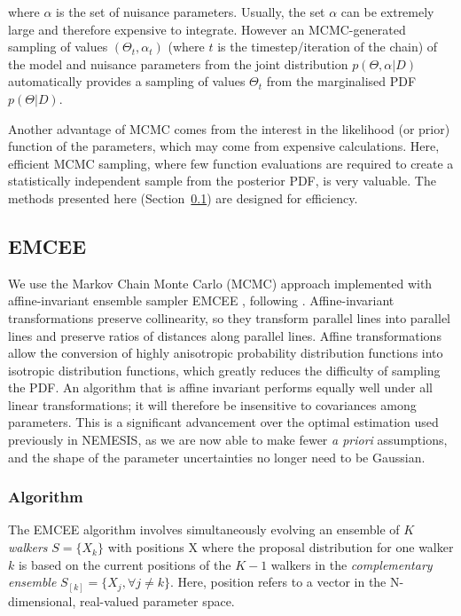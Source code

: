 \documentclass[11pt, a4paper,titlepage]{report}
\begin{document}
where $\alpha$ is the set of nuisance parameters. Usually, the set $\alpha$ can be extremely large and therefore expensive to integrate. However an MCMC-generated sampling of values  $(\Theta_t,\alpha_t)$ (where $t$ is the timestep/iteration of the chain) of the model and nuisance parameters from the joint distribution $p(\Theta, \alpha | D)$ automatically provides a sampling of values $\Theta_t$ from the marginalised PDF $p(\Theta | D)$.

Another advantage of MCMC comes from the interest in the likelihood (or prior) function of the parameters, which may come from expensive calculations. Here, efficient MCMC sampling, where few function evaluations are required to create a statistically independent sample from the posterior PDF, is very valuable.  The methods presented here (Section~\ref{section:emcee}) are designed for efficiency.

\subsection{EMCEE} \label{section:emcee}

We use the Markov Chain Monte Carlo (MCMC) approach implemented with affine-invariant ensemble sampler EMCEE \citep{foreman-mackey13}, following \citet{line15}. Affine-invariant transformations preserve collinearity, so they transform parallel lines into parallel lines and preserve ratios of distances along parallel lines. Affine transformations allow the conversion of highly anisotropic probability distribution functions into isotropic distribution functions, which greatly reduces the difficulty of sampling the PDF. An algorithm that is affine invariant performs equally well under all linear transformations; it will therefore be insensitive to covariances among parameters. This is a significant advancement over the optimal estimation used previously in NEMESIS, as we are now able to make fewer \textit{a priori} assumptions, and the shape of the parameter uncertainties no longer need to be Gaussian. 

\subsubsection{Algorithm}

The EMCEE algorithm involves simultaneously evolving an ensemble of $K$ \textit{walkers} $S = \{X_k\}$ with positions X where the proposal distribution for one walker $k$ is based on the current positions of the $K - 1$ walkers in the \textit{complementary ensemble} $S_{[k]} = \{X_j , \forall j \neq k\}$. Here, position refers to a vector in the N-dimensional, real-valued parameter space.
\end{document}
